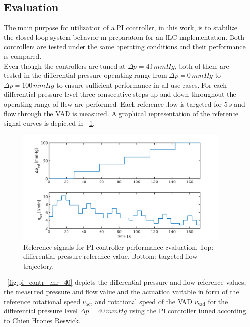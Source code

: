 \subsection{Evaluation}
The main purpose for utilization of a PI controller, in this work, is to stabilize the closed loop system behavior in preparation for an ILC implementation.
Both controllers are tested under the same operating conditions and their performance is compared.
\\Even though the controllers are tuned at $\Delta{p}=40\,mmHg$, both of them  are tested in the differential pressure operating range from $\Delta{p}=0\,mmHg$ to $\Delta{p}=100\,mmHg$ to ensure sufficient performance in all use cases.
For each differential pressure level three consecutive steps up and down throughout the operating range of flow are performed. Each reference flow is targeted for $5\,s$ and flow through the VAD is measured. A graphical representation of the reference signal curves is depicted in \figurename~\ref{fig:PI_control_ref_signals}.
\begin{figure}[ht]
  \centering
  \includegraphics[width=0.95\textwidth]{images/chapt_5/PI_control_ref_signals.pdf}
  \caption[Reference signals for PI controller performance evaluation]{Reference signals for PI controller performance evaluation. Top: differential pressure reference value. Bottom: targeted flow trajectory.}
  \label{fig:PI_control_ref_signals}
\end{figure}
\figurename~\ref{fig:pi_contr_chr_40} depicts the differential pressure and flow reference values, the measured pressure and flow value and the actuation variable in form of the reference rotational speed $v_{\mathrm{act}}$ and rotational speed of the VAD $v_{\mathrm{vad}}$ for the differential pressure level $\Delta{p}=40\,mmHg$ using the PI controller tuned according to Chien Hrones Reswick.
